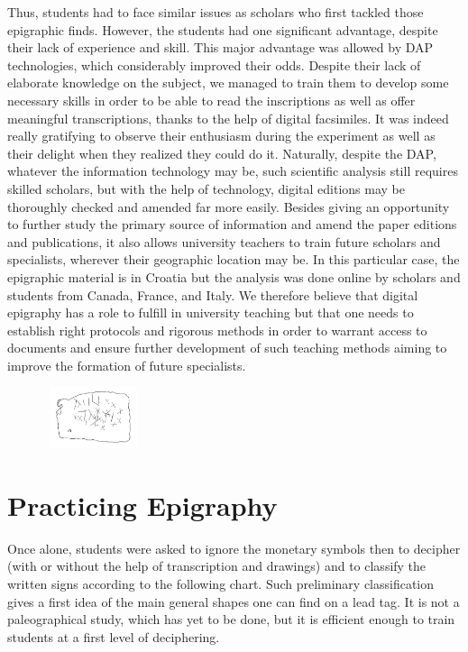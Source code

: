 \documentclass[amsthm,ebook]{saparticle}
\begin{document}
Thus, students had to face similar issues as scholars who first tackled those epigraphic finds. However, the students
had one significant advantage, despite their lack of experience and skill. This major advantage was allowed by DAP
technologies, which considerably improved their odds. Despite their lack of elaborate knowledge on the subject, we
managed to train them to develop some necessary skills in order to be able to read the inscriptions as well as offer
meaningful transcriptions, thanks to the help of digital facsimiles. It was indeed really gratifying to observe their
enthusiasm during the experiment as well as their delight when they realized they could do it. Naturally, despite the
DAP, whatever the information technology may be, such scientific analysis still requires skilled scholars, but with the
help of technology, digital editions may be thoroughly checked and amended far more easily. Besides giving an
opportunity to further study the primary source of information and amend the paper editions and publications, it also
allows university teachers to train future scholars and specialists, wherever their geographic location may be. In this
particular case, the epigraphic material is in Croatia but the analysis was done online by scholars and students from
Canada, France, and Italy. We therefore believe that digital epigraphy has a role to fulfill in university teaching but
that one needs to establish right protocols and rigorous methods in order to warrant access to documents and ensure
further development of such teaching methods aiming to improve the formation of future specialists.

\begin{figure}
\centering
\includegraphics[width=2.965cm,height=1.79cm]{EAGLE16lameetalteaching-img006.png}
\end{figure}

\section{Practicing Epigraphy}


Once alone, students were asked to ignore the monetary symbols then to decipher (with or without the help of
transcription and drawings) and to classify the written signs according to the following chart. Such preliminary
classification gives a first idea of the main general shapes one can find on a lead tag. It is not a paleographical
study, which has yet to be done, but it is efficient enough to train students at a first level of deciphering.
\end{document}
